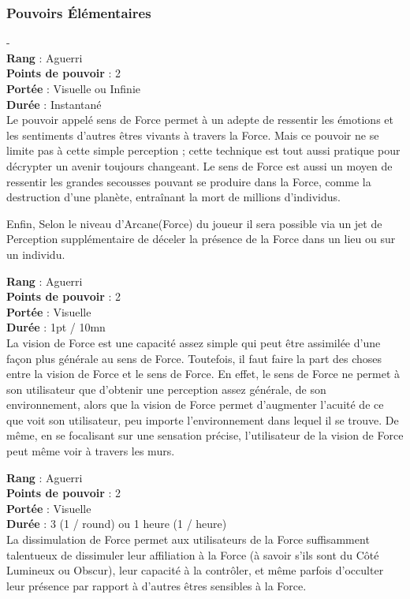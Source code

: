 \subsubsection{Pouvoirs \'Elémentaires}
\begin{description}[align=left] 
    \item [Sens de Force] -\\
	    \textbf{Rang} : Aguerri\\
		\textbf{Points de pouvoir} : 2\\
		\textbf{Portée} : Visuelle ou Infinie\\
		\textbf{Durée} : Instantané\\
        Le pouvoir appelé sens de Force permet à un adepte de ressentir les émotions et les sentiments d’autres êtres vivants à travers la Force. Mais ce pouvoir ne se limite pas à cette simple perception ; cette technique est tout aussi pratique pour décrypter un avenir toujours changeant. Le sens de Force est aussi un moyen de ressentir les grandes secousses pouvant se produire dans la Force, comme la destruction d’une planète, entraînant la mort de millions d’individus. 

        Enfin, Selon le niveau d'Arcane(Force) du joueur il sera possible via un jet de Perception supplémentaire de déceler la présence de la Force dans un lieu ou sur un individu.

    \item [Vision de Force]
    	\textbf{Rang} : Aguerri\\
		\textbf{Points de pouvoir} : 2\\
		\textbf{Portée} : Visuelle\\
		\textbf{Durée} : 1pt / 10mn\\
    	La vision de Force est une capacité assez simple qui peut être assimilée d’une façon plus générale au sens de Force. Toutefois, il faut faire la part des choses entre la vision de Force et le sens de Force. En effet, le sens de Force ne permet à son utilisateur que d’obtenir une perception assez générale, de son environnement, alors que la vision de Force permet d’augmenter l’acuité de ce que voit son utilisateur, peu importe l’environnement dans lequel il se trouve. De même, en se focalisant sur une sensation précise, l’utilisateur de la vision de Force peut même voir à travers les murs.

	\item [Dissimulation de Force]
	    \textbf{Rang} : Aguerri\\
		\textbf{Points de pouvoir} : 2\\
		\textbf{Portée} : Visuelle\\
		\textbf{Durée} : 3 (1 / round) ou 1 heure (1 / heure)\\
		La dissimulation de Force permet aux utilisateurs de la Force suffisamment talentueux de dissimuler leur affiliation à la Force (à savoir s'ils sont du Côté Lumineux ou Obscur), leur capacité à la contrôler, et même parfois d'occulter leur présence par rapport à d'autres êtres sensibles à la Force. 


\end{description}
